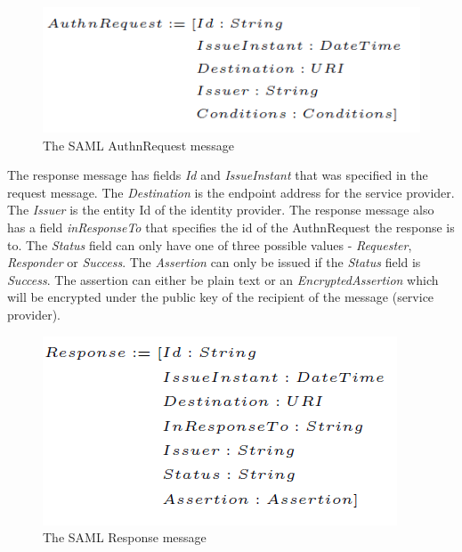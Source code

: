 \documentclass[twosided]{report}
\begin{document}
\begin{figure}[H]
	\centering
	\includegraphics[scale=0.5]{images/SAMLAuthnRequest.png}
	\caption{The SAML AuthnRequest message}
\end{figure}
\par
The response message has fields \emph{Id} and \emph{IssueInstant} that was specified in the request message. The \emph{Destination} is the endpoint address for the service provider. The \emph{Issuer} is the entity Id of the identity provider. The response message also has a field \emph{inResponseTo} that specifies the id of the AuthnRequest the response is to. The \emph{Status} field can only have one of three possible values - \emph{Requester}, \emph{Responder} or \emph{Success}. The \emph{Assertion} can only be issued if the \emph{Status} field is \emph{Success}. The assertion can either be plain text or an \emph{EncryptedAssertion} which will be encrypted under the public key of the recipient of the message (service provider).
\begin{figure}[H]
	\centering
	\includegraphics[scale=0.5]{images/SAMLResponse.png}
	\caption{The SAML Response message}
\end{figure}
\end{document}
